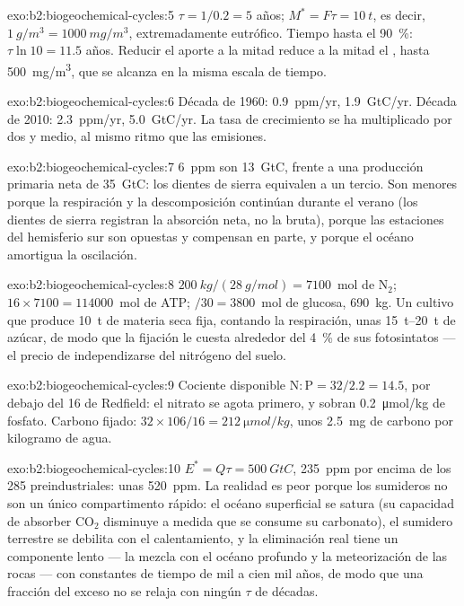 \begin{solution}{exo:b2:biogeochemical-cycles:5}
$\tau = 1/0.2 = 5$ años; $M^{*} = F\tau = \qty{10}{t}$, es decir,
$\qty{1}{g/m^3} = \qty{1000}{mg/m^3}$, extremadamente eutrófico. Tiempo
hasta el \qty{90}{\%}: $\tau\ln 10 = 11.5$ años. Reducir el aporte a la
mitad reduce a la mitad el , hasta \qty{500}{mg/m^3},
que se alcanza en la misma escala de tiempo.
\end{solution}

\begin{solution}{exo:b2:biogeochemical-cycles:6}
Década de 1960: \qty{0.9}{ppm/yr}, \qty{1.9}{GtC/yr}. Década de 2010:
\qty{2.3}{ppm/yr}, \qty{5.0}{GtC/yr}. La tasa de crecimiento se ha
multiplicado por dos y medio, al mismo ritmo que las emisiones.
\end{solution}

\begin{solution}{exo:b2:biogeochemical-cycles:7}
\qty{6}{ppm} son \qty{13}{GtC}, frente a una producción primaria neta de
\qty{35}{GtC}: los dientes de sierra equivalen a un tercio. Son menores
porque la respiración y la descomposición continúan durante el verano (los
dientes de sierra registran la absorción neta, no la bruta), porque las
estaciones del hemisferio sur son opuestas y compensan en parte, y porque
el océano amortigua la oscilación.
\end{solution}

\begin{solution}{exo:b2:biogeochemical-cycles:8}
$\qty{200}{kg}/(\qty{28}{g/mol}) = 7100$~mol de $\mathrm{N_2}$; $16\times
7100 = \num{114000}$~mol de ATP; $/30 = 3800$~mol de glucosa, \qty{690}{kg}.
Un cultivo que produce \qty{10}{t} de materia seca fija, contando la
respiración, unas
\qtyrange{15}{20}{t} de azúcar, de modo que la fijación le cuesta alrededor
del \qty{4}{\%} de sus fotosintatos --- el precio de independizarse del
nitrógeno del suelo.
\end{solution}

\begin{solution}{exo:b2:biogeochemical-cycles:9}
Cociente disponible $\mathrm{N:P} = 32/2.2 = 14.5$, por debajo del 16 de
Redfield: el nitrato se agota primero, y sobran \qty{0.2}{\micro mol/kg}
de fosfato. Carbono fijado: $32\times 106/16 =
\qty{212}{\micro mol/kg}$, unos \qty{2.5}{mg} de carbono por
kilogramo de agua.
\end{solution}

\begin{solution}{exo:b2:biogeochemical-cycles:10}
$E^{*} = Q\tau = \qty{500}{GtC}$, \qty{235}{ppm} por encima de los 285
preindustriales: unas \qty{520}{ppm}. La realidad es peor porque los
sumideros no son un único compartimento rápido: el océano superficial se
satura (su capacidad de absorber $\mathrm{CO_2}$ disminuye a medida que se
consume su carbonato), el sumidero terrestre se debilita con el
calentamiento, y la eliminación real tiene un componente lento --- la mezcla
con el océano profundo y la meteorización de las rocas --- con constantes
de tiempo de mil a cien mil años, de modo que una fracción del exceso no se
relaja con ningún $\tau$ de décadas.
\end{solution}

